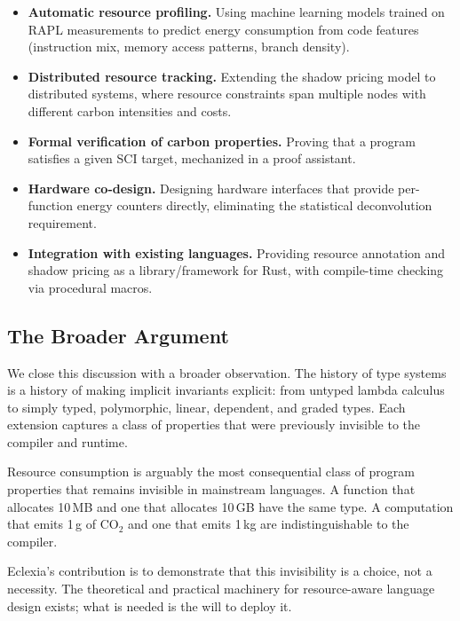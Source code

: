 \documentclass[11pt,a4paper]{article}
\begin{document}
\begin{itemize}
  \item \textbf{Automatic resource profiling.}  Using machine learning models
    trained on RAPL measurements to predict energy consumption from code
    features (instruction mix, memory access patterns, branch density).

  \item \textbf{Distributed resource tracking.}  Extending the shadow pricing
    model to distributed systems, where resource constraints span multiple
    nodes with different carbon intensities and costs.

  \item \textbf{Formal verification of carbon properties.}  Proving that a
    program satisfies a given SCI target, mechanized in a proof assistant.

  \item \textbf{Hardware co-design.}  Designing hardware interfaces that
    provide per-function energy counters directly, eliminating the statistical
    deconvolution requirement.

  \item \textbf{Integration with existing languages.}  Providing resource
    annotation and shadow pricing as a library/framework for Rust, with
    compile-time checking via procedural macros.
\end{itemize}

\subsection{The Broader Argument}

We close this discussion with a broader observation.  The history of type systems
is a history of making implicit invariants explicit: from untyped lambda calculus
to simply typed, polymorphic, linear, dependent, and graded types.  Each
extension captures a class of properties that were previously invisible to the
compiler and runtime.

Resource consumption is arguably the most consequential class of program
properties that remains invisible in mainstream languages.  A function that
allocates 10\,MB and one that allocates 10\,GB have the same type.  A
computation that emits 1\,g of CO$_2$ and one that emits 1\,kg are
indistinguishable to the compiler.

Eclexia's contribution is to demonstrate that this invisibility is a choice,
not a necessity.  The theoretical and practical machinery for resource-aware
language design exists; what is needed is the will to deploy it.
\end{document}
